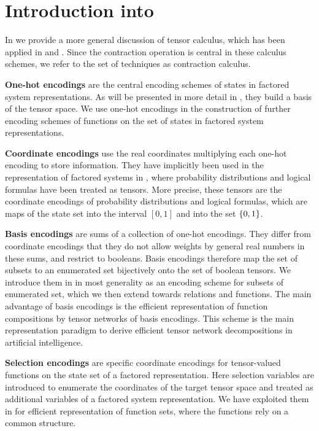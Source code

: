 \chapter{Introduction into }

In  we provide a more general discussion of tensor calculus, which has been applied in  and .
Since the contraction operation is central in these calculus schemes, we refer to the set of techniques as contraction calculus.


\textbf{One-hot encodings} are the central encoding schemes of states in factored system representations.
As will be presented in more detail in , they build a basis of the tensor space.
We use one-hot encodings in the construction of further encoding schemes of functions on the set of states in factored system representations.

\textbf{Coordinate encodings} use the real coordinates multiplying each one-hot encoding to store information.
They have implicitly been used in the representation of factored systems in , where probability distributions and logical formulas have been treated as tensors.
More precise, these tensors are the coordinate encodings of probability distributions and logical formulas, which are maps of the state set into the interval $[0,1]$ and into the set $\{0,1\}$.

\textbf{Basis encodings} are sums of a collection of one-hot encodings.
They differ from coordinate encodings that they do not allow weights by general real numbers in these sums, and restrict to booleans.
Basis encodings therefore map the set of subsets to an enumerated set bijectively onto the set of boolean tensors.
We introduce them in  in most generality as an encoding scheme for subsets of enumerated set, which we then extend towards relations and functions.
The main advantage of basis encodings is the efficient representation of function compositions by tensor networks of basis encodings.
This scheme is the main representation paradigm to derive efficient tensor network decompositions in artificial intelligence.

\textbf{Selection encodings} are specific coordinate encodings for tensor-valued functions on the state set of a factored representation.
Here selection variables are introduced to enumerate the coordinates of the target tensor space and treated as additional variables of a factored system representation.
We have exploited them in  for efficient representation of function sets, where the functions rely on a common structure.

